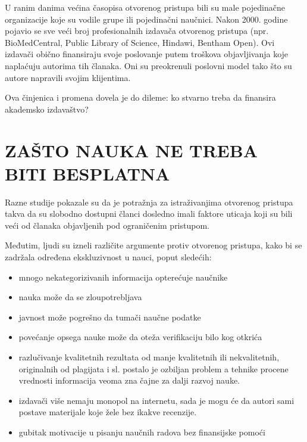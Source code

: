 \documentclass[12pt,a4paper]{article}
\begin{document}
   U ranim danima većina časopisa otvorenog pristupa bili su male pojedinačne organizacije koje su vodile grupe ili pojedinačni naučnici. Nakon 2000. godine pojavio se sve veći broj profesionalnih izdavača otvorenog pristupa (npr. BioMedCentral, Public Library of Science, Hindawi, Bentham Open). Ovi izdavači obično finansiraju svoje poslovanje putem troškova objavljivanja koje naplaćuju autorima tih članaka. Oni su preokrenuli poslovni model tako što su autore napravili svojim klijentima. 
   
   Ova činjenica i promena dovela je do dileme: ko stvarno treba da finansira akademsko izdavaštvo? 



    \section{\large\textbf{ZAŠTO NAUKA NE TREBA BITI BESPLATNA}}
    \indent
     Razne studije pokazale su da je potražnja za istraživanjima otvorenog pristupa takva da su slobodno dostupni članci dosledno imali faktore uticaja koji su bili veći od članaka objavljenih pod ograničenim pristupom.
  
     Međutim, ljudi su izneli različite argumente protiv otvorenog pristupa, kako bi se zadržala određena ekskluzivnost u nauci, poput sledećih:

     \begin{itemize}
         \item mnogo nekategorizivanih informacija opterećuje naučnike
         \item nauka može da se zloupotrebljava
         \item javnost može pogrešno da tumači naučne podatke
         \item povećanje opsega nauke može da oteža verifikaciju bilo kog otkrića
         \item razlučivanje kvalitetnih rezultata od manje kvalitetnih ili nekvalitetnih, originalnih od plagijata i sl. postalo je ozbiljan problem a tehnike procene vrednosti informacija veoma zna čajne za dalji razvoj nauke.
         \item izdavači više nemaju monopol na internetu, sada je mogu će da autori sami postave materijale koje žele bez ikakve recenzije.
         \item gubitak motivacije u pisanju naučnih radova bez finansijske pomoći
         
     \end{itemize}
\end{document}
